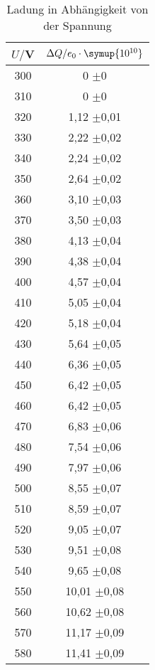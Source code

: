 \begin{table}[H]
  \centering
  \caption{Ladung in Abhängigkeit von der Spannung}
  \label{tab:Rechteckspannung}
  \begin{tabular}{c c}
    \toprule
    $U/$V & $\Delta Q/e_0 \cdot \symup{10^{10}}$ \\
    \midrule
      300 &                  0   $\pm 0$ \\
      310 &                  0   $\pm 0$ \\
      320 &        1,12    $\pm$0,01 \\
      330 &        2,22    $\pm$0,02 \\
      340 &        2,24    $\pm$0,02 \\
      350 &        2,64    $\pm$0,02 \\
      360 &        3,10    $\pm$0,03 \\
      370 &        3,50    $\pm$0,03 \\
      380 &        4,13    $\pm$0,04 \\
      390 &        4,38    $\pm$0,04 \\
      400 &        4,57    $\pm$0,04 \\
      410 &        5,05    $\pm$0,04 \\
      420 &        5,18    $\pm$0,04 \\
      430 &        5,64    $\pm$0,05 \\
      440 &        6,36    $\pm$0,05 \\
      450 &        6,42    $\pm$0,05 \\
      460 &        6,42    $\pm$0,05 \\
      470 &        6,83    $\pm$0,06 \\
      480 &        7,54    $\pm$0,06 \\
      490 &        7,97    $\pm$0,06 \\
      500 &        8,55    $\pm$0,07 \\
      510 &        8,59    $\pm$0,07 \\
      520 &        9,05    $\pm$0,07 \\
      530 &        9,51    $\pm$0,08 \\
      540 &        9,65    $\pm$0,08 \\
      550 &        10,01   $\pm$0,08 \\
      560 &        10,62   $\pm$0,08 \\
      570 &        11,17   $\pm$0,09 \\
      580 &        11,41   $\pm$0,09 \\

\end{tabular}
\end{table}
